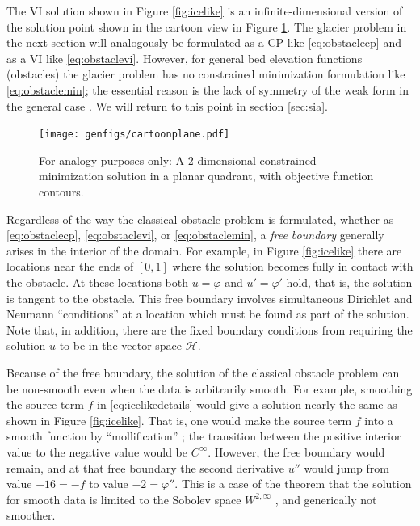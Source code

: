 \documentclass[letterpaper,final,12pt,reqno]{amsart}
\numberwithin{equation}{section}
\numberwithin{figure}{section}
\numberwithin{table}{section}
\begin{document}
The VI solution shown in Figure \ref{fig:icelike} is an infinite-dimensional version of the solution point shown in the cartoon view in Figure \ref{fig:cartoonplane}.  The glacier problem in the next section will analogously be formulated as a CP like \eqref{eq:obstaclecp} and as a VI like \eqref{eq:obstaclevi}.  However, for general bed elevation functions (obstacles) the glacier problem has no constrained minimization formulation like \eqref{eq:obstaclemin}; the essential reason is the lack of symmetry of the weak form in the general case \cite{JouvetBueler2012}.  We will return to this point in section \ref{sec:sia}.

\begin{figure}
\texttt{[image: genfigs/cartoonplane.pdf]}
\caption{For analogy purposes only:  A 2-dimensional constrained-minimization solution in a planar quadrant, with objective function contours.}
\label{fig:cartoonplane}
\end{figure}

Regardless of the way the classical obstacle problem is formulated, whether as \eqref{eq:obstaclecp}, \eqref{eq:obstaclevi}, or \eqref{eq:obstaclemin}, a \emph{free boundary} generally arises in the interior of the domain.  For example, in Figure \ref{fig:icelike} there are locations near the ends of $[0,1]$ where the solution becomes fully in contact with the obstacle.  At these locations both $u=\varphi$ and $u'=\varphi'$ hold, that is, the solution is tangent to the obstacle.  This free boundary involves simultaneous Dirichlet and Neumann ``conditions'' at a location which must be found as part of the solution.  Note that, in addition, there are the fixed boundary conditions from requiring the solution $u$ to be in the vector space $\mathcal{H}$.

Because of the free boundary, the solution of the classical obstacle problem can be non-smooth even when the data is arbitrarily smooth.  For example, smoothing the source term $f$ in \eqref{eq:icelikedetails} would give a solution nearly the same as shown in Figure \ref{fig:icelike}.  That is, one would make the source term $f$ into a smooth function by ``mollification'' \cite{Evans2010}; the transition between the positive interior value to the negative value would be $C^\infty$.  However, the free boundary would remain, and at that free boundary the second derivative $u''$ would jump from value $+16=-f$ to value $-2=\varphi''$.  This is a case of the theorem that the solution for smooth data is limited to the Sobolev space $W^{2,\infty}$ \cite{KinderlehrerStampacchia1980}, and generically not smoother.
\end{document}
